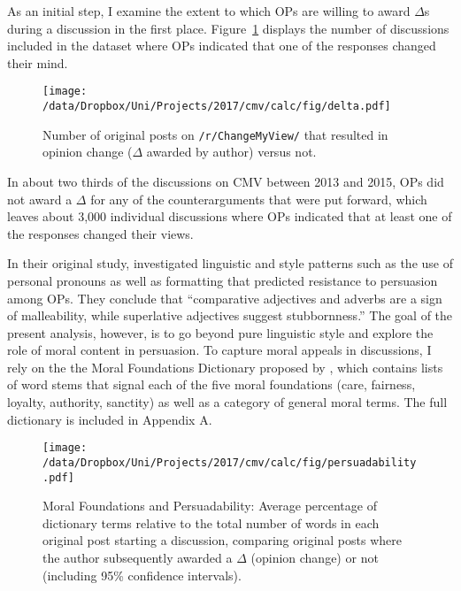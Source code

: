 As an initial step, I examine the extent to which OPs are willing to award $\Delta$s during a discussion in the first place. Figure~\ref{fig:delta} displays the number of discussions included in the dataset where OPs indicated that one of the responses changed their mind.

\begin{figure}[ht]
\centering
\texttt{[image: /data/Dropbox/Uni/Projects/2017/cmv/calc/fig/delta.pdf]}
\caption[Number of original posts on \texttt{/r/ChangeMyView/} that resulted in opinion change]{Number of original posts on \texttt{/r/ChangeMyView/} that resulted in opinion change ($\Delta$ awarded by author) versus not.}\label{fig:delta}
\end{figure}

In about two thirds of the discussions on CMV between 2013 and 2015, OPs did not award a $\Delta$ for any of the counterarguments that were put forward, which leaves about 3,000 individual discussions where OPs indicated that at least one of the responses changed their views.

In their original study, \citet{tan2016winning} investigated linguistic and style patterns such as the use of personal pronouns as well as formatting that predicted resistance to persuasion among OPs. They conclude that ``comparative adjectives and adverbs are a sign of malleability, while superlative adjectives suggest stubbornness.'' The goal of the present analysis, however, is to go beyond pure linguistic style and explore the role of moral content in persuasion. To capture moral appeals in discussions, I rely on the the Moral Foundations Dictionary proposed by \citet{graham2009liberals}, which contains lists of word stems that signal each of the five moral foundations (care, fairness, loyalty, authority, sanctity) as well as a category of general moral terms. The full dictionary is included in Appendix A.

\begin{figure}[ht]
\centering
\texttt{[image: /data/Dropbox/Uni/Projects/2017/cmv/calc/fig/persuadability.pdf]}
\caption[Moral Foundations and Persuadability]{Moral Foundations and Persuadability: Average percentage of dictionary terms relative to the total number of words in each original post starting a discussion, comparing original posts where the author subsequently awarded a $\Delta$ (opinion change) or not (including 95\% confidence intervals).}\label{fig:persuadability}
\end{figure}

